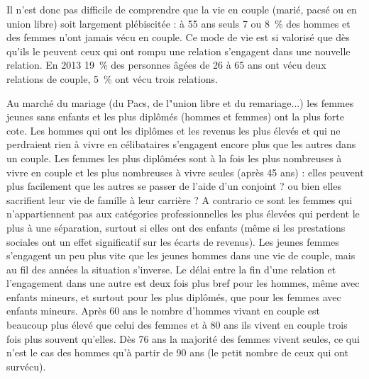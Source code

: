 {Il n'est donc pas difficile de comprendre que la vie en couple (marié, pacsé ou en union libre) soit largement plébiscitée : à 55 ans seuls 7 ou 8~\% des hommes et des femmes n'ont jamais vécu en couple. Ce mode de vie est si valorisé que dès qu'ils le peuvent ceux qui ont rompu une relation s'engagent dans une nouvelle relation. En 2013 19~\% des personnes âgées de 26 à 65 ans ont vécu deux relations de couple, 5~\% ont vécu trois relations. 

Au marché du mariage (du Pacs, de l"union libre et du remariage...) les femmes jeunes sans enfants et les plus diplômés (hommes et femmes) ont la plus forte cote. Les hommes qui ont les diplômes et les revenus les plus élevés et qui ne perdraient rien à vivre en célibataires s'engagent encore plus que les autres dans un couple. Les femmes les plus diplômées sont à la fois les plus nombreuses à vivre en couple et les plus nombreuses à vivre seules (après 45 ans) : elles peuvent plus facilement que les autres se passer de l'aide d'un conjoint ? ou bien elles sacrifient leur vie de famille à leur carrière ? A contrario ce sont les femmes qui n'appartiennent pas aux catégories professionnelles les plus élevées qui perdent le plus à une séparation, surtout si elles ont des enfants (même si les prestations sociales ont un effet significatif sur les écarts de revenus). Les jeunes femmes s'engagent un peu plus vite que les jeunes hommes dans une vie de couple, mais au fil des années la situation s'inverse. Le délai entre la fin d'une relation et l'engagement dans une autre est deux fois plus bref pour les hommes, même avec enfants mineurs, et surtout pour les plus diplômés, que pour les femmes avec enfants mineurs. Après 60 ans le nombre d'hommes vivant en couple est beaucoup plus élevé que celui des femmes et à 80 ans ils vivent en couple trois fois plus souvent qu'elles. Dès 76 ans la majorité des femmes vivent seules, ce qui n'est le cas des hommes qu'à partir de 90 ans (le petit nombre de ceux qui ont survécu).

}
